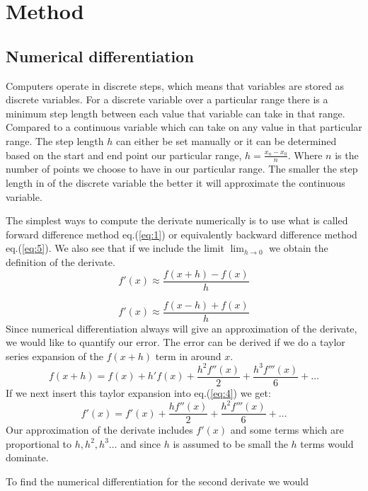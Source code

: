 \section*{Method}
\subsection*{Numerical differentiation}
\par Computers operate in discrete steps, which means that variables are stored as discrete variables. For a discrete variable over a particular range there is a minimum step length between each value that variable can take in that range. Compared to a continuous variable which can take on any value in that particular range. The step length $h$ can either be set manually or it can be determined based on the start and end point our particular range, $h = \frac{x_n -x_0}{n}$. Where $n$ is the number of points we choose to have in our particular range. The smaller the step length in of the discrete variable the better it will approximate the continuous variable.  
\par
The simplest ways to compute the derivate numerically is to use what is called forward difference method eq.(\ref{eq:1}) or equivalently backward difference method eq.(\ref{eq:5}). We also see that if we include the limit $\lim_{h\to 0}$ we obtain the definition of the derivate. 
\begin{equation}\label{eq:1}
    f'(x) \approx \frac{f(x+h)-f(x)}{h}
\end{equation}

\begin{equation}\label{eq:5}
  f'(x) \approx \frac{f(x-h)+f(x)}{h}
\end{equation}
Since numerical differentiation always will give an approximation of the derivate, we would like to quantify our error. The error can be derived if we do a taylor series expansion of the $f(x+h)$ term in around $x$.
\begin{equation}\label{eq:4}
    f(x+h) = f(x) + h'f(x) + \frac{h^2f''(x)}{2} + \frac{h^3f'''(x)}{6} + \dots    
\end{equation}   
If we next insert this taylor expansion into eq.(\ref{eq:4}) we get:
\begin{equation}
  f'(x) = f'(x) + \frac{h f''(x)}{2} + \frac{h^2f'''(x)}{6} + \dots
\end{equation} 
Our approximation of the derivate includes $f'(x)$ and some terms which are proportional to $h, h^2, h^3 \dots $ and since $h$ is assumed to be small the $h$ terms would dominate. 
\par
To find the numerical differentiation for the second derivate we would 
